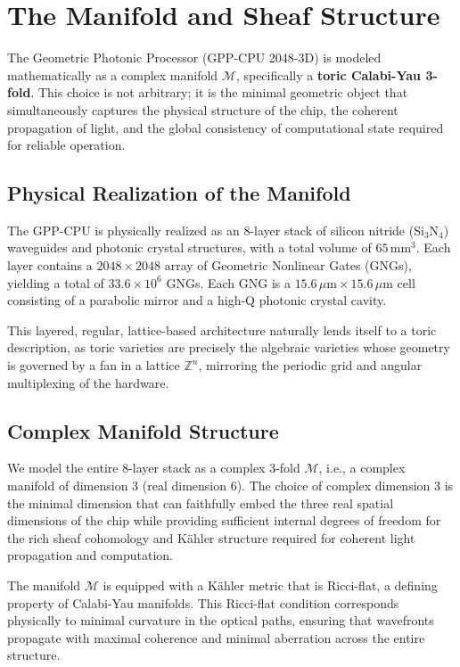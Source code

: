 \section{The Manifold and Sheaf Structure}

The Geometric Photonic Processor (GPP-CPU 2048-3D) is modeled mathematically as a complex manifold \(\mathcal{M}\), specifically a \textbf{toric Calabi-Yau 3-fold}. This choice is not arbitrary; it is the minimal geometric object that simultaneously captures the physical structure of the chip, the coherent propagation of light, and the global consistency of computational state required for reliable operation.

\subsection{Physical Realization of the Manifold}

The GPP-CPU is physically realized as an 8-layer stack of silicon nitride (\(\mathrm{Si_3N_4}\)) waveguides and photonic crystal structures, with a total volume of \(65\,\mathrm{mm}^3\). Each layer contains a \(2048 \times 2048\) array of Geometric Nonlinear Gates (GNGs), yielding a total of \(33.6 \times 10^6\) GNGs. Each GNG is a \(15.6\,\mu\mathrm{m} \times 15.6\,\mu\mathrm{m}\) cell consisting of a parabolic mirror and a high-Q photonic crystal cavity.

This layered, regular, lattice-based architecture naturally lends itself to a toric description, as toric varieties are precisely the algebraic varieties whose geometry is governed by a fan in a lattice \(\mathbb{Z}^n\), mirroring the periodic grid and angular multiplexing of the hardware.

\subsection{Complex Manifold Structure}

We model the entire 8-layer stack as a complex 3-fold \(\mathcal{M}\), i.e., a complex manifold of dimension 3 (real dimension 6). The choice of complex dimension 3 is the minimal dimension that can faithfully embed the three real spatial dimensions of the chip while providing sufficient internal degrees of freedom for the rich sheaf cohomology and Kähler structure required for coherent light propagation and computation.

The manifold \(\mathcal{M}\) is equipped with a Kähler metric that is Ricci-flat, a defining property of Calabi-Yau manifolds. This Ricci-flat condition corresponds physically to minimal curvature in the optical paths, ensuring that wavefronts propagate with maximal coherence and minimal aberration across the entire structure.

